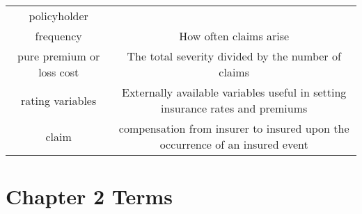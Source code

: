 \documentclass[]{book}
\begin{document}
\begin{longtable}[]{@{}cc@{}}
\begin{minipage}[t]{0.42\columnwidth}
policyholder\strut
\end{minipage}\tabularnewline
\begin{minipage}[t]{0.41\columnwidth}\centering\strut
frequency\strut
\end{minipage} & \begin{minipage}[t]{0.42\columnwidth}\centering\strut
How often claims arise\strut
\end{minipage}\tabularnewline
\begin{minipage}[t]{0.41\columnwidth}\centering\strut
pure premium or loss cost\strut
\end{minipage} & \begin{minipage}[t]{0.42\columnwidth}\centering\strut
The total severity divided by the number of claims\strut
\end{minipage}\tabularnewline
\begin{minipage}[t]{0.41\columnwidth}\centering\strut
rating variables\strut
\end{minipage} & \begin{minipage}[t]{0.42\columnwidth}\centering\strut
Externally available variables useful in setting insurance rates and
premiums\strut
\end{minipage}\tabularnewline
\begin{minipage}[t]{0.41\columnwidth}\centering\strut
claim\strut
\end{minipage} & \begin{minipage}[t]{0.42\columnwidth}\centering\strut
compensation from insurer to insured upon the occurrence of an insured
event\strut
\end{minipage}\tabularnewline
\bottomrule
\end{longtable}

\section{Chapter 2 Terms}\label{chapter-2-terms}
\end{document}
